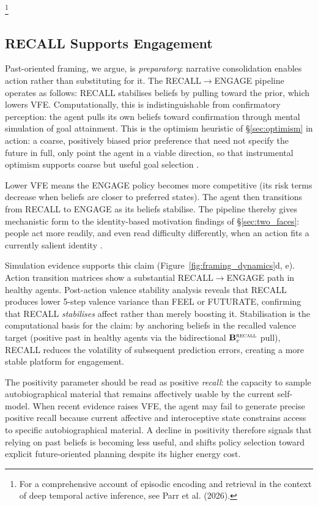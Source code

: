 \documentclass[11pt,a4paper]{article}
\newcommand{\rr}{\color{red!70!black}}
\begin{document}
\footnote{For a comprehensive account of episodic encoding and retrieval in the context of deep temporal active inference, see Parr et al. (2026).}

\subsection{RECALL Supports Engagement}\label{sec:recall_engagement}

Past-oriented framing, we argue, is \emph{preparatory}: narrative consolidation enables action rather than substituting for it. The RECALL$\to$ENGAGE pipeline operates as follows: RECALL stabilises beliefs by pulling toward the prior, which lowers VFE. Computationally, this is indistinguishable from confirmatory perception: the agent pulls its own beliefs toward confirmation through mental simulation of goal attainment. {\rr This is the optimism heuristic of \S\ref{sec:optimism} in action: a coarse, positively biased prior preference that need not specify the future in full, only point the agent in a viable direction, so that instrumental optimism supports coarse but useful goal selection \citep{fisherhohwy2024, tschantzetal2020}.}

Lower VFE means the ENGAGE policy becomes more competitive (its risk terms decrease when beliefs are closer to preferred states). The agent then transitions from RECALL to ENGAGE as its beliefs stabilise. {\rr The pipeline thereby gives mechanistic form to the identity-based motivation findings of \S\ref{sec:two_faces}: people act more readily, and even read difficulty differently, when an action fits a currently salient identity \citep{oyserman2009}.}

Simulation evidence supports this claim (Figure~\ref{fig:framing_dynamics}d, e). Action transition matrices show a substantial RECALL$\to$ENGAGE path in healthy agents. Post-action valence stability analysis reveals that RECALL produces lower 5-step valence variance than FEEL or FUTURATE, confirming that RECALL \emph{stabilises} affect rather than merely boosting it. Stabilisation is the computational basis for the claim: by anchoring beliefs in the recalled valence target (positive past in healthy agents via the bidirectional $\mathbf{B}_v^{\textsc{recall}}$ pull), RECALL reduces the volatility of subsequent prediction errors, creating a more stable platform for engagement.

The positivity parameter should be read as positive \emph{recall}: the capacity to sample autobiographical material that remains affectively usable by the current self-model. When recent evidence raises VFE, the agent may fail to generate precise positive recall because current affective and interoceptive state constrains access to specific autobiographical material. A decline in positivity therefore signals that relying on past beliefs is becoming less useful, and shifts policy selection toward explicit future-oriented planning despite its higher energy cost.
\end{document}
